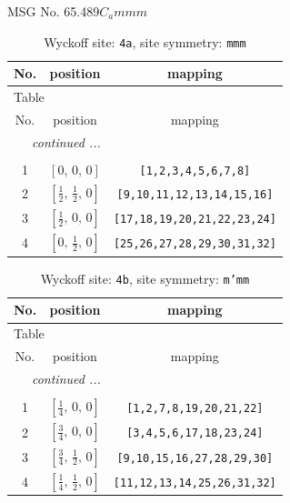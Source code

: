 \documentclass[fleqn,8pt]{jsarticle}
\begin{document}
\setcounter{MaxMatrixCols}{32}

\renewcommand{\tablename}{Table~}
\renewcommand{\figurename}{Figure~}
\begin{center}
\LARGE
MSG No. 65.489\quad$C_{a}mmm$
\end{center}
\renewcommand{\arraystretch}{1.2}
\begin{longtable}{ccc}
\caption{Wyckoff site: {\tt 4a}, site symmetry: {\tt mmm}}
 \\
 \hline \hline
No. & position & mapping \\ \hline \endfirsthead

\multicolumn{2}{l}{\tablename\ \thetable{}} \\
 \hline \hline
No. & position & mapping \\ \hline \endhead

 \hline \hline
\multicolumn{2}{r}{\footnotesize\it continued ...} \\ \endfoot

 \hline \hline
\multicolumn{2}{r}{} \\ \endlastfoot

1 & $\left[ 0,\, 0,\, 0 \right]$ & {\tt [1,2,3,4,5,6,7,8]} \\ \hline
2 & $\left[ \frac{1}{2},\, \frac{1}{2},\, 0 \right]$ & {\tt [9,10,11,12,13,14,15,16]} \\ \hline
3 & $\left[ \frac{1}{2},\, 0,\, 0 \right]$ & {\tt [17,18,19,20,21,22,23,24]} \\ \hline
4 & $\left[ 0,\, \frac{1}{2},\, 0 \right]$ & {\tt [25,26,27,28,29,30,31,32]} \\
\end{longtable}
\renewcommand{\arraystretch}{1.2}
\begin{longtable}{ccc}
\caption{Wyckoff site: {\tt 4b}, site symmetry: {\tt m'mm}}
 \\
 \hline \hline
No. & position & mapping \\ \hline \endfirsthead

\multicolumn{2}{l}{\tablename\ \thetable{}} \\
 \hline \hline
No. & position & mapping \\ \hline \endhead

 \hline \hline
\multicolumn{2}{r}{\footnotesize\it continued ...} \\ \endfoot

 \hline \hline
\multicolumn{2}{r}{} \\ \endlastfoot

1 & $\left[ \frac{1}{4},\, 0,\, 0 \right]$ & {\tt [1,2,7,8,19,20,21,22]} \\ \hline
2 & $\left[ \frac{3}{4},\, 0,\, 0 \right]$ & {\tt [3,4,5,6,17,18,23,24]} \\ \hline
3 & $\left[ \frac{3}{4},\, \frac{1}{2},\, 0 \right]$ & {\tt [9,10,15,16,27,28,29,30]} \\ \hline
4 & $\left[ \frac{1}{4},\, \frac{1}{2},\, 0 \right]$ & {\tt [11,12,13,14,25,26,31,32]} \\
\end{longtable}
\end{document}
